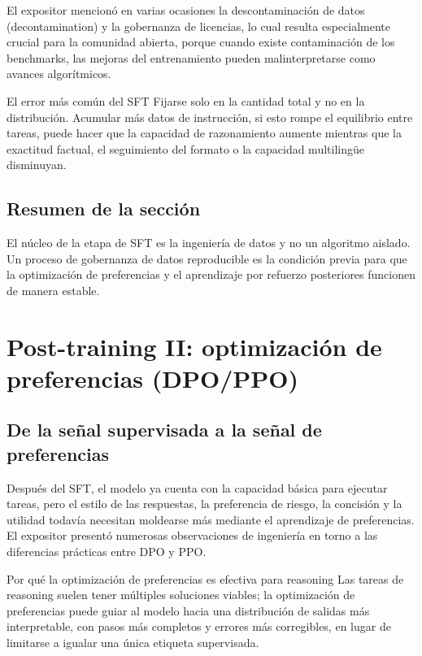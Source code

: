 \documentclass[a4paper]{article}
\begin{document}
El expositor mencionó en varias ocasiones la descontaminación de datos (decontamination) y la gobernanza de licencias, lo cual resulta especialmente crucial para la comunidad abierta, porque cuando existe contaminación de los benchmarks, las mejoras del entrenamiento pueden malinterpretarse como avances algorítmicos.

\begin{warningbox}{El error más común del SFT}
Fijarse solo en la cantidad total y no en la distribución. Acumular más datos de instrucción, si esto rompe el equilibrio entre tareas, puede hacer que la capacidad de razonamiento aumente mientras que la exactitud factual, el seguimiento del formato o la capacidad multilingüe disminuyan.
\end{warningbox}

\subsection{Resumen de la sección}
El núcleo de la etapa de SFT es la ingeniería de datos y no un algoritmo aislado. Un proceso de gobernanza de datos reproducible es la condición previa para que la optimización de preferencias y el aprendizaje por refuerzo posteriores funcionen de manera estable.


\section{Post-training II: optimización de preferencias (DPO/PPO)}

\subsection{De la señal supervisada a la señal de preferencias}
Después del SFT, el modelo ya cuenta con la capacidad básica para ejecutar tareas, pero el estilo de las respuestas, la preferencia de riesgo, la concisión y la utilidad todavía necesitan moldearse más mediante el aprendizaje de preferencias. El expositor presentó numerosas observaciones de ingeniería en torno a las diferencias prácticas entre DPO y PPO.

\begin{importantbox}{Por qué la optimización de preferencias es efectiva para reasoning}
Las tareas de reasoning suelen tener múltiples soluciones viables; la optimización de preferencias puede guiar al modelo hacia una distribución de salidas más interpretable, con pasos más completos y errores más corregibles, en lugar de limitarse a igualar una única etiqueta supervisada.
\end{importantbox}
\end{document}
